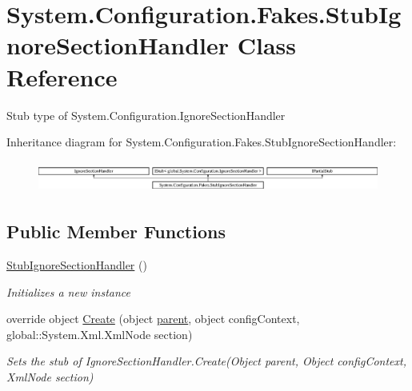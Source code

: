 \hypertarget{class_system_1_1_configuration_1_1_fakes_1_1_stub_ignore_section_handler}{\section{System.\-Configuration.\-Fakes.\-Stub\-Ignore\-Section\-Handler Class Reference}
\label{class_system_1_1_configuration_1_1_fakes_1_1_stub_ignore_section_handler}
}


Stub type of System.\-Configuration.\-Ignore\-Section\-Handler 


Inheritance diagram for System.\-Configuration.\-Fakes.\-Stub\-Ignore\-Section\-Handler\-:\begin{figure}[H]
\begin{center}
\leavevmode
\includegraphics[height=1.045752cm]{class_system_1_1_configuration_1_1_fakes_1_1_stub_ignore_section_handler}
\end{center}
\end{figure}
\subsection*{Public Member Functions}
\begin{DoxyCompactItemize}
\item 
\hyperlink{class_system_1_1_configuration_1_1_fakes_1_1_stub_ignore_section_handler_aa941e8ce46edd4e24dcbb5350ad033bf}{Stub\-Ignore\-Section\-Handler} ()
\begin{DoxyCompactList}\small\item\em Initializes a new instance\end{DoxyCompactList}\item 
override object \hyperlink{class_system_1_1_configuration_1_1_fakes_1_1_stub_ignore_section_handler_a69d2c46a30cb87b9a324c062d33fc244}{Create} (object \hyperlink{jquery-1_810_82-vsdoc_8js_aed9b5e7a755bcccb282f9b06c00a6822}{parent}, object config\-Context, global\-::\-System.\-Xml.\-Xml\-Node section)
\begin{DoxyCompactList}\small\item\em Sets the stub of Ignore\-Section\-Handler.\-Create(\-Object parent, Object config\-Context, Xml\-Node section)\end{DoxyCompactList}\end{DoxyCompactItemize}
